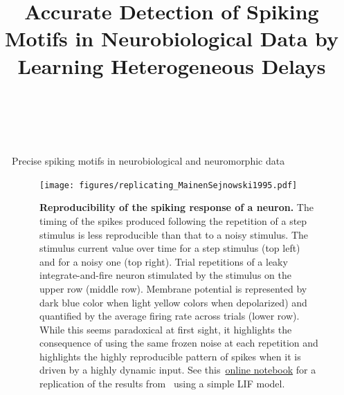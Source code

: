 \documentclass[final]{beamer}
\title{Accurate Detection of Spiking Motifs in Neurobiological Data by Learning Heterogeneous Delays
}
\author{\FirstLP\  \LastLP}
\institute[shortinst]{\inst{1} Some Institute \samelineand \inst{2} Another Institute}
\newlength{\sepwidth}
\newlength{\colwidth}
\newcommand{\separatorcolumn}{\begin{column}{\sepwidth}\end{column}}
\begin{document}
\begin{frame}[t]
\begin{columns}[t]
\separatorcolumn

\begin{column}{\colwidth}

  \begin{block}{Precise spiking motifs in neurobiological and neuromorphic data~\parencite{Grimaldi22polychronies}}


\begin{figure}[H]
\texttt{[image: figures/replicating\_MainenSejnowski1995.pdf]} 
\caption{
 \textbf{Reproducibility of the spiking response of a neuron.} 
The timing of the spikes produced following the repetition of a step stimulus is less reproducible than that to a noisy stimulus. The stimulus current value over time for a step stimulus (top left) and for a noisy one (top right). Trial repetitions of a leaky integrate-and-fire neuron stimulated by the stimulus on the upper row (middle row). Membrane potential is represented by dark blue color when light yellow colors when depolarized) and quantified by the average firing rate across trials (lower row). While this seems paradoxical at first sight, it highlights the consequence of using the same frozen noise at each repetition and highlights the highly reproducible pattern of spikes when it is driven by a highly dynamic input. See this~\href{https://github.com/laurentperrinet/2022_UE-neurosciences-computationnelles/blob/master/C_MainenSejnowski1995_Perrinet.ipynb}{online notebook}  for a replication of the results from~\parencite{mainen_reliability_1995} using a simple LIF model.}\label{fig:mainen}
\end{figure}
    



\end{block}
\end{column}
\end{columns}
\end{frame}
\end{document}
